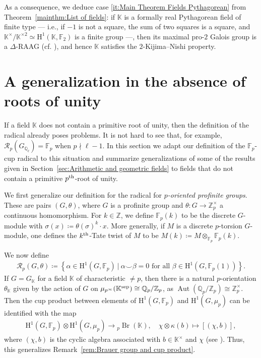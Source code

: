 \documentclass{amsart}
\theoremstyle{definition}
\theoremstyle{remark}
\DeclareMathOperator{\Br}{Br}
\DeclareMathOperator{\Aut}{Aut}
\newcommand{\KK}{\mathbb{K}}
\newcommand{\ZZ}{\mathbb{Z}}
\newcommand{\QQ}{\mathbb{Q}}
\newcommand{\FF}{\mathbb{F}}
\newcommand{\calR}{\mathcal{R}}
\newcommand{\rmH}{\mathrm H}%
\newcommand{\set}[2]{\left\lbrace{#1}\ \big\vert\ {#2}\right\rbrace}
\newcommand{\F}{\FF}
\newcommand{\pth}{{p^{\rm th}}}
\begin{document}
As a consequence, we deduce case \ref{it:Main Theorem Fields Pythagorean} from Theorem~\ref{mainthm:List of fields}: if $\KK$ is a formally real Pythagorean field of finite type --- i.e., if $-1$ is not a square, the sum of two squares is a square, and $\KK^\times/\KK^{\times 2}\simeq \rmH^1(\KK,\F_2)$ is a finite group ---, then its maximal pro-$2$ Galois group is a $\Delta$-RAAG (cf. \cite[Thm. 2.1]{deltaRAAGs}), and hence $\KK$ satisfies the $2$-Kijima--Nishi property.


\section{A generalization in the absence of roots of unity}
\label{sec:No roots of unity}
If a field $\KK$ does not contain a primitive root of unity, then the definition of the radical already poses problems. It is not hard to see that, for example, $\calR_p(G_{\QQ_\ell})=\FF_p$ when $p\nmid \ell-1$. In this section we adapt our definition of the $\FF_p$-cup radical to this situation and summarize generalizations of some of the results given in Section~\ref{sec:Arithmetic and geometric fields} to fields that do not contain a primitive $\pth$-root of unity. 

We first generalize our definition for the radical for \emph{$p$-oriented profinite groups}. These are pairs $(G,\theta)$, where $G$ is a profinite group and $\theta:G\to \ZZ_p^\times$ a continuous homomorphism. For $k\in \ZZ$, we define $\FF_p(k)$ to be the discrete $G$-module with $\sigma(x)\coloneq \theta(\sigma)^k\cdot x$. More generally, if $M$ is a discrete $p$-torsion $G$-module, one defines the $k^{\rm th}$-Tate twist of $M$ to be $M(k)\coloneq M\otimes_{\FF_p} \FF_p(k)$.

We now define
\begin{align*}
    \calR_p(G,\theta)\coloneq \set{\alpha\in \rmH^1(G,\FF_p)}{\alpha \smallsmile\beta=0\text{ for all }\beta \in \rmH^1(G,\FF_p(1))}.
\end{align*}
If $G=G_{\KK}$ for a field $\KK$ of characteristic $\neq p$, then there is a natural $p$-orientation $\theta_{\KK}$ given by the action of $G$ on $\mu_{p^\infty}(\KK^{\rm sep})\cong \QQ_p/\ZZ_p$, as $\Aut(\QQ_p/\ZZ_p)\cong \ZZ_p^\times$. Then the cup product between elements of $\rmH^1(G,\F_p)$ and $\rmH^1(G,\mu_p)$ can be identified with the map
\begin{align*}
    \rmH^1(G,\FF_p)\otimes \rmH^1(G,\mu_p)\to {}_p\Br(\KK),\quad \chi\otimes \kappa(b)\mapsto [(\chi,b)],
\end{align*}
where $(\chi,b)$ is the cyclic algebra associated with $b\in\KK^\times$ and $\chi$ (see \cite[Const.~2.5.1 and Prop.~4.7.1]{GilleSzamuely}). Thus, this generalizes Remark~\ref{rem:Brauer group and cup product}.
\end{document}
